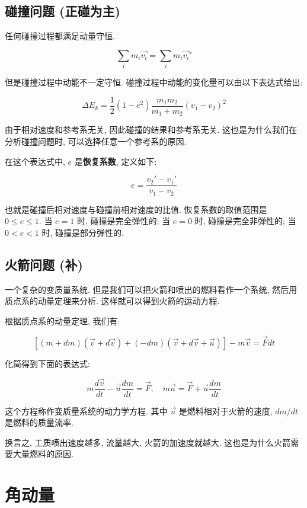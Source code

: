 \documentclass[
  a4paper,
]{ctexrep}
\begin{document}
\subsection{碰撞问题
(正碰为主)}\label{ux78b0ux649eux95eeux9898-ux6b63ux78b0ux4e3aux4e3b}

任何碰撞过程都满足动量守恒.

\[\sum_i m_i \vec{v_i} = \sum_i m_i \vec{v_i}'\]

但是碰撞过程中动能不一定守恒.
碰撞过程中动能的变化量可以由以下表达式给出:

\[
\Delta E_k = \frac{1}{2} (1-e^2) \frac{m_1 m_2}{m_1 + m_2} (v_1 - v_2)^2
\]

由于相对速度和参考系无关, 因此碰撞的结果和参考系无关.
这也是为什么我们在分析碰撞问题时, 可以选择任意一个参考系的原因.

在这个表达式中, \(e\) 是\textbf{恢复系数}, 定义如下:

\[
e = \frac{v_2' - v_1'}{v_1 - v_2}
\]

也就是碰撞后相对速度与碰撞前相对速度的比值. 恢复系数的取值范围是
\(0 \leq e \leq 1\). 当 \(e=1\) 时, 碰撞是完全弹性的; 当 \(e=0\) 时,
碰撞是完全非弹性的; 当 \(0 < e < 1\) 时, 碰撞是部分弹性的.

\subsection{火箭问题 (补)}\label{ux706bux7badux95eeux9898-ux8865}

一个复杂的变质量系统. 但是我们可以把火箭和喷出的燃料看作一个系统,
然后用质点系的动量定理来分析. 这样就可以得到火箭的运动方程.

根据质点系的动量定理, 我们有:

\[
[(m + dm)(\vec{v} + d\vec{v})+(-dm) (\vec{v} + d\vec{v} + \vec{u})] - m \vec{v} = \vec{F} dt
\]

化简得到下面的表达式:

\[
m \frac{d\vec{v}}{dt} - \vec{u} \frac{dm}{dt} = \vec{F}, \quad m \vec{a} = \vec{F} + \vec{u} \frac{dm}{dt}
\]

这个方程称作变质量系统的动力学方程. 其中 \(\vec{u}\)
是燃料相对于火箭的速度, \(dm/dt\) 是燃料的质量流率.

换言之, 工质喷出速度越多, 流量越大, 火箭的加速度就越大.
这也是为什么火箭需要大量燃料的原因.

\section{角动量}\label{ux89d2ux52a8ux91cf}
\end{document}
